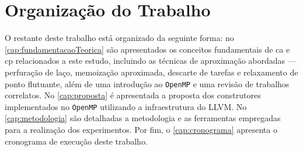 \section{Organização do Trabalho}\label{cap:org_trabalho}

O restante deste trabalho está organizado da seguinte forma: no \autoref{cap:fundamentacaoTeorica} são apresentados os conceitos fundamentais de \gls{ca} e \gls{cp} relacionados a este estudo, incluindo as técnicas de aproximação abordadas — perfuração de laço, memoização aproximada, descarte de tarefas e relaxamento de ponto flutuante, além de uma introdução ao \texttt{OpenMP} e uma revisão de trabalhos correlatos. No \autoref{cap:proposta} é apresentada a proposta dos construtores implementados no \texttt{OpenMP} utilizando a infraestrutura do LLVM. No \autoref{cap:metodologia} são detalhadas a metodologia e as ferramentas empregadas para a realização dos experimentos. Por fim, o \autoref{cap:cronograma} apresenta o cronograma de execução deste trabalho.

